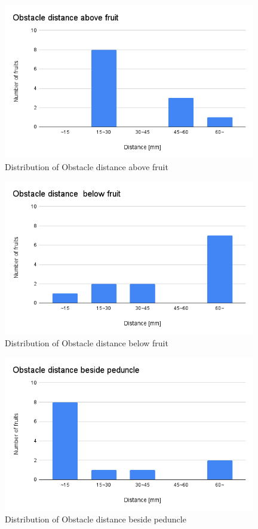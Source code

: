 \begin{figure}[H]
  \centering
  \includegraphics[width=110mm]{images/png/resultabovef.png}
  \caption{Distribution of Obstacle distance above fruit}
  \label{Fig:resultabovef}
\end{figure}

\begin{figure}[H]
  \centering
  \includegraphics[width=110mm]{images/png/resultbelowf.png}
  \caption{Distribution of Obstacle distance below fruit}
  \label{Fig:resultbelowf}
\end{figure}

\begin{figure}[H]
  \centering
  \includegraphics[width=110mm]{images/png/resultbesidep.png}
  \caption{Distribution of Obstacle distance beside peduncle}
  \label{Fig:resultbesidep}
\end{figure}

